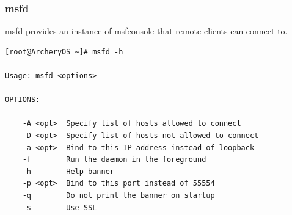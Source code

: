\documentclass{article}
\begin{document}
\subsubsection{msfd}
msfd provides an instance of msfconsole that remote clients can connect to.
\begin{lstlisting}
[root@ArcheryOS ~]# msfd -h

Usage: msfd <options>

OPTIONS:

    -A <opt>  Specify list of hosts allowed to connect
    -D <opt>  Specify list of hosts not allowed to connect
    -a <opt>  Bind to this IP address instead of loopback
    -f        Run the daemon in the foreground
    -h        Help banner
    -p <opt>  Bind to this port instead of 55554
    -q        Do not print the banner on startup
    -s        Use SSL
\end{lstlisting}
\end{document}
